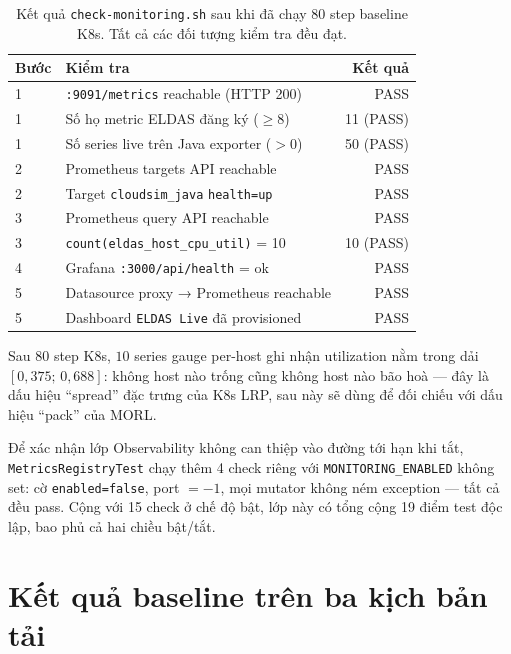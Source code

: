 \begin{table}[H]
  \centering
  \caption{Kết quả \texttt{check-monitoring.sh} sau khi đã chạy 80 step
  baseline K8s. Tất cả các đối tượng kiểm tra đều đạt.}
  \label{tab:t57-results}
  \footnotesize
  \begin{tabularx}{\linewidth}{l X r}
    \toprule
    \textbf{Bước} & \textbf{Kiểm tra} & \textbf{Kết quả} \\
    \midrule
    1 & \texttt{:9091/metrics} reachable (HTTP 200) & PASS \\
    1 & Số họ metric ELDAS đăng ký ($\geq 8$) & 11 (PASS) \\
    1 & Số series live trên Java exporter ($> 0$) & 50 (PASS) \\
    2 & Prometheus targets API reachable & PASS \\
    2 & Target \texttt{cloudsim\_java} \texttt{health=up} & PASS \\
    3 & Prometheus query API reachable & PASS \\
    3 & \texttt{count(eldas\_host\_cpu\_util)} = 10 & 10 (PASS) \\
    4 & Grafana \texttt{:3000/api/health} = ok & PASS \\
    5 & Datasource proxy → Prometheus reachable & PASS \\
    5 & Dashboard \texttt{ELDAS Live} đã provisioned & PASS \\
    \bottomrule
  \end{tabularx}
\end{table}

Sau 80 step K8s, $10$ series gauge per-host ghi nhận utilization nằm
trong dải $[0{,}375;\, 0{,}688]$: không host nào trống cũng không host
nào bão hoà --- đây là dấu hiệu ``spread'' đặc trưng của K8s LRP, sau
này sẽ dùng để đối chiếu với dấu hiệu ``pack'' của MORL.

Để xác nhận lớp Observability không can thiệp vào đường tới hạn khi
tắt, \texttt{MetricsRegistryTest} chạy thêm 4 check riêng với
\texttt{MONITORING\_ENABLED} không set: cờ \texttt{enabled=false},
port $= -1$, mọi mutator không ném exception --- tất cả đều pass.
Cộng với 15 check ở chế độ bật, lớp này có tổng cộng 19 điểm test
độc lập, bao phủ cả hai chiều bật/tắt.

\section{Kết quả baseline trên ba kịch bản tải}
\label{sec:res-baseline}

